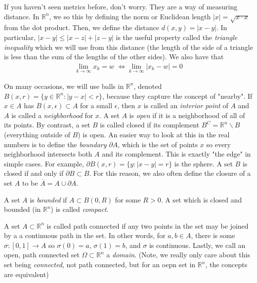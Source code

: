 \documentclass{article}
\newcommand{\R}{{\mathbb{R}}}
\newcommand{\cl}[1]{{\overline{#1}}}
\newcommand{\pd}{\partial}
\begin{document}
	If you haven't seen metrics before, don't worry. They are a way of measuring distance. In $\R^{n}$, we so this by defining the norm or Euclidean length $|x| = \sqrt{x \cdot x}$ from the dot product. Then, we define the distance $d(x,y) = |x-y|$. In particular, $|x - y| \leq |x-z| + |z-y|$ is the useful property called the \textit{triangle inequality} which we will use from this distance (the length of the side of a triangle is less than the sum of the lengths of the other sides). We also have that 
	\begin{align*}
		\lim_{k \to \infty} x_{k} = w \,\, \Leftrightarrow \lim_{k \to \infty} |x_{k} - w| = 0
	\end{align*}
	
	On many occasions, we will use balls in $\R^{n}$, denoted $B(x,r) = \{y \in \R^{n} : |y-x| < r\}$, because they capture the concept of "nearby". If $x \in A$ has $B(x,\epsilon) \subset A$ for a small $\epsilon$, then $x$ is called an \textit{interior point} of $A$ and $A$ is called a \textit{neighborhood} for $x$. A set $A$ is \textit{open} if it is a neighborhood of all of its points. By contrast, a set $B$ is called closed if its complement $B^{C} = \R^{n} \backslash B$ (everything outside of $B$) is open. An easier way to look at this in the real numbers is to define the \textit{boundary} $\pd A$, which is the set of points $x$ so every neighborhood intersects both $A$ and its complement. This is exactly "the edge" in simple cases. For example, $\pd B(x,r) = \{ y : |x-y| = r\}$ is the sphere. A set $B$ is closed if and only if $\pd B \subset B$. For this reason, we also often define the closure of a set $A$ to be $\cl{A} = A \cup \pd A$. 
	
	\vspace{0.25 cm}
	
	A set $A$ is \textit{bounded} if $A \subset B(0,R)$ for some $R>0$. A set which is closed and bounded (in $\R^{n}$) is called \textit{compact}.
	
	A set $A \subset \R^{n}$ is called path connected if any two points in the set may be joined by a a continuous path in the set. In other words, for $a,b \in A$, there is some $\sigma: [0,1] \to A$ so $\sigma(0) = a$, $\sigma(1) = b$, and $\sigma$ is continuous. Lastly, we call an open, path connected set $\Omega \subset \R^{n}$ a \textit{domain}. (Note, we really only care about this set being \textit{connected}, not path connected, but for an oepn set in $\R^{n}$, the concepts are equivalent)
	
	\vspace{0.25 cm}
	
\end{document}
